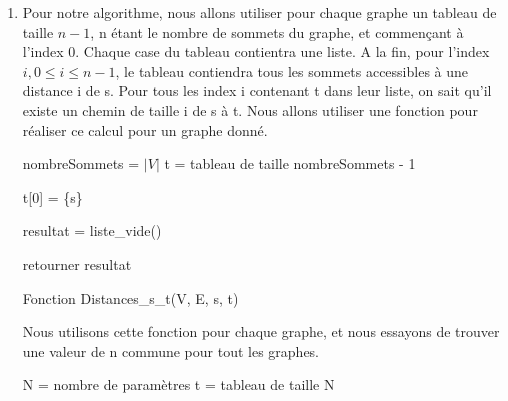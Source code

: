 \documentclass{article}
\begin{document}
\begin{enumerate}
\item 

Pour notre algorithme, nous allons utiliser pour chaque graphe un tableau de taille $n - 1$, n étant le nombre de sommets du graphe, et commençant à l'index 0. Chaque case du tableau contientra une liste. A la fin, pour l'index $i, 0 \le i \le n - 1$, le tableau contiendra tous les sommets accessibles à une distance i de s. Pour tous les index i contenant t dans leur liste, on sait qu'il existe un chemin de taille i de s à t.
Nous allons utiliser une fonction pour réaliser ce calcul pour un graphe donné.

\begin{algorithm}[H]
\BlankLine

nombreSommets = $|V|$\;
t = tableau de taille nombreSommets - 1\;
\BlankLine

t[0] = \{s\}\;
\BlankLine

 {
}
\BlankLine

resultat = liste\_vide()\;
\BlankLine

retourner resultat\;
\caption{Fonction Distances\_s\_t(V, E, s, t)}
\end{algorithm}



\newpage
Nous utilisons cette fonction pour chaque graphe, et nous essayons de trouver une valeur de n commune pour tout les graphes.

\begin{algorithm}

N = nombre de paramètres\;
t = tableau de taille N\;

\BlankLine

\end{algorithm}
\end{enumerate}
\end{document}
